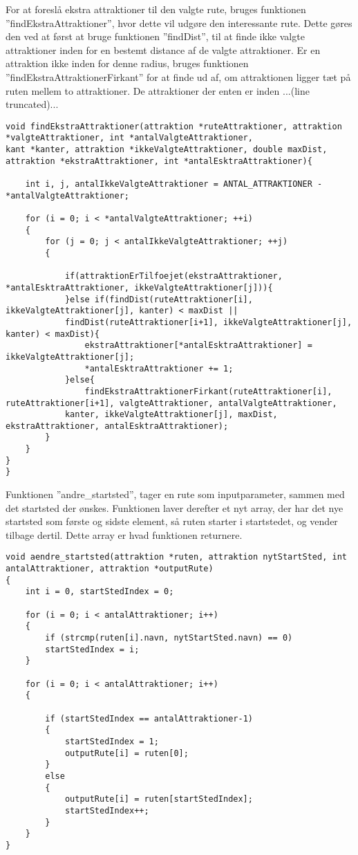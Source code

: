 For at foreslå ekstra attraktioner til den valgte rute, bruges funktionen ”findEkstraAttraktioner”, hvor dette vil udgøre den interessante rute. Dette gøres den ved at først at bruge funktionen ”findDist”, til at finde ikke valgte attraktioner inden for en bestemt distance af de valgte attraktioner. Er en attraktion ikke inden for denne radius, bruges funktionen ”findEkstraAttraktionerFirkant” for at finde ud af, om attraktionen ligger tæt på ruten mellem to attraktioner. De attraktioner der enten er inden ...(line truncated)...

\begin{lstlisting}
void findEkstraAttraktioner(attraktion *ruteAttraktioner, attraktion *valgteAttraktioner, int *antalValgteAttraktioner, 
kant *kanter, attraktion *ikkeValgteAttraktioner, double maxDist, attraktion *ekstraAttraktioner, int *antalEsktraAttraktioner){
	
	int i, j, antalIkkeValgteAttraktioner = ANTAL_ATTRAKTIONER - *antalValgteAttraktioner;
	
	for (i = 0; i < *antalValgteAttraktioner; ++i)
	{
		for (j = 0; j < antalIkkeValgteAttraktioner; ++j)
		{
			
			if(attraktionErTilfoejet(ekstraAttraktioner, *antalEsktraAttraktioner, ikkeValgteAttraktioner[j])){
			}else if(findDist(ruteAttraktioner[i], ikkeValgteAttraktioner[j], kanter) < maxDist || 
			findDist(ruteAttraktioner[i+1], ikkeValgteAttraktioner[j], kanter) < maxDist){
				ekstraAttraktioner[*antalEsktraAttraktioner] = ikkeValgteAttraktioner[j];
				*antalEsktraAttraktioner += 1;
			}else{
				findEkstraAttraktionerFirkant(ruteAttraktioner[i], ruteAttraktioner[i+1], valgteAttraktioner, antalValgteAttraktioner,
			kanter, ikkeValgteAttraktioner[j], maxDist, ekstraAttraktioner, antalEsktraAttraktioner);
		}
	}
}
}
\end{lstlisting}

Funktionen ”andre\_startsted”, tager en rute som inputparameter, sammen med det startsted der ønskes. Funktionen laver derefter et nyt array, der har det nye startsted som første og sidste element, så ruten starter i startstedet, og vender tilbage dertil. Dette array er hvad funktionen returnere. 

\begin{lstlisting}
void aendre_startsted(attraktion *ruten, attraktion nytStartSted, int antalAttraktioner, attraktion *outputRute)
{
	int i = 0, startStedIndex = 0;
	
	for (i = 0; i < antalAttraktioner; i++)
	{
		if (strcmp(ruten[i].navn, nytStartSted.navn) == 0)
		startStedIndex = i;
	}
	
	for (i = 0; i < antalAttraktioner; i++)
	{
		
		if (startStedIndex == antalAttraktioner-1)
		{
			startStedIndex = 1;
			outputRute[i] = ruten[0];
		}
		else
		{
			outputRute[i] = ruten[startStedIndex];
			startStedIndex++;
		}
	}
}
\end{lstlisting}

